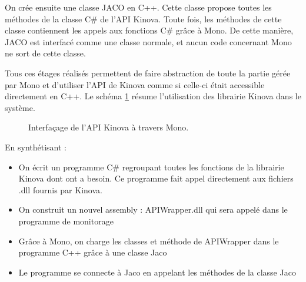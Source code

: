 \documentclass[letterpaper, twoside, 12pt, memoire, creativecommons, hyperref]{thETS}
\begin{document}
On crée ensuite une classe JACO en C++. Cette classe propose toutes les méthodes de la classe C\# de l'API Kinova. Toute fois, les méthodes de cette classe contiennent les appels aux fonctions C\# grâce à Mono. De cette manière, JACO est interfacé comme une classe normale, et aucun code concernant Mono ne sort de cette classe. 

Tous ces étages réalisés permettent de faire abstraction de toute la partie gérée par Mono et d’utiliser l’API de Kinova comme si celle-ci était accessible directement en C++. Le schéma \ref{fig:mono} résume l'utilisation des librairie Kinova dans le système.

\begin{figure}
	\centering
	\caption{Interfaçage de l'API Kinova à travers Mono.}
	\label{fig:mono}
\end{figure}

En synthétisant :
\begin{itemize}
 \item On écrit un programme C\# regroupant toutes les fonctions de la librairie Kinova dont ont a besoin. Ce programme fait appel directement aux fichiers .dll fournis par Kinova. 
 \item On construit un nouvel assembly : APIWrapper.dll qui sera appelé dans le programme de monitorage
 \item Grâce à Mono, on charge les classes et méthode de APIWrapper dans le programme C++ grâce à une classe Jaco
 \item Le programme se connecte à Jaco en appelant les méthodes de la classe Jaco
\end{itemize}
\end{document}
